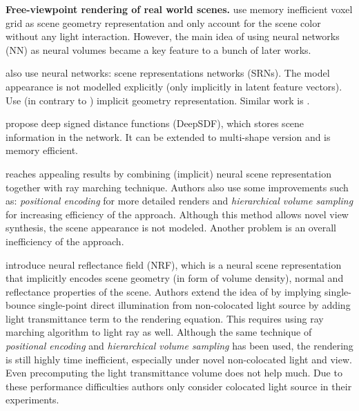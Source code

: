 \documentclass[english]{article}
\newcommand{\rphr}[1]{{\color{blue}#1}}
\begin{document}


\textbf{Free-viewpoint rendering of real world scenes.} \cite{lombardi2019} use memory inefficient voxel grid as scene geometry representation and only account for the scene color without any light interaction. However, the main idea of using neural networks (NN) as neural volumes became a key feature to a bunch of later works.

\cite{sitzmann2019} also use neural networks: scene representations networks (SRNs). The model appearance is not modelled explicitly (only implicitly in latent feature vectors). Use (in contrary to \cite{lombardi2019}) implicit geometry representation. Similar work is \cite{pifu2019}.

\cite{deepsdf2019} propose deep signed distance functions (DeepSDF), which stores scene information in the network. It can be extended to multi-shape version and is memory efficient.

\cite{nerf2020mildenhall} reaches appealing results by combining (implicit) neural scene representation together with ray marching technique. Authors also use some improvements such as: \textit{positional encoding} for more detailed renders and \textit{hierarchical volume sampling} for increasing efficiency of the approach. Although this method allows novel view synthesis, the scene appearance is not modeled. Another problem is an overall inefficiency of the approach.

\cite{nrf2020} introduce neural reflectance field (NRF), which is a neural scene representation that implicitly encodes scene geometry (in form of volume density), normal and reflectance properties of the scene. Authors extend the idea of \cite{nerf2020mildenhall} by implying single-bounce single-point direct illumination from non-colocated light source by adding light transmittance term to the rendering equation. This requires using ray marching algorithm to light ray as well. Although the same technique of \textit{positional encoding} and \textit{hierarchical volume sampling} has been used, the rendering is still highly time inefficient, especially under novel non-colocated light and view. Even precomputing the light transmittance volume does not help much. Due to these performance difficulties authors only consider colocated light source in their experiments.
\end{document}

